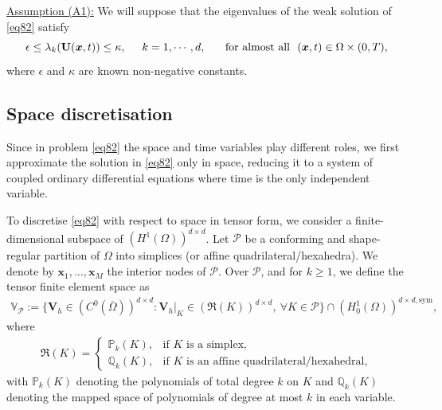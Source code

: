 \documentclass[final,12pt]{amsart}
\theoremstyle{plain}
\theoremstyle{definition}
\newcommand\bx{\boldsymbol{x}}
\newcommand\calP{{\mathcal{P}}}
\newcommand\bU{\mathbf{U}}
\begin{document}
\noindent\underline{Assumption (A1):} We will suppose that the eigenvalues of the weak solution of \eqref{eq82} satisfy 
\begin{equation}
	\epsilon\leq \lambda_{k}(\bU(\bx,t))\leq \kappa, \hspace{0.5cm}k=1,\cdots,d,\hspace{0.5cm}\text{ for almost all}\ \  (\bx,t)\in \Omega\times(0,T),\label{eq14}
\end{equation}
where $\epsilon$ and $\kappa$ are known non-negative constants.


\subsection{Space discretisation}
Since in problem \eqref{eq82} the space and time variables play different roles, we first approximate the solution in \eqref{eq82} only in space, reducing it to a system of coupled ordinary differential equations where time is the only independent variable.

To discretise \eqref{eq82} with respect to space in tensor form, we consider a finite-dimensional subspace of \((H^{1}(\Omega))^{d\times d}\). Let \(\calP\) be a conforming and shape-regular partition of \(\Omega\) into simplices (or affine quadrilateral/hexahedra).  We denote by $\boldsymbol{x}_1^{},\ldots,\boldsymbol{x}_M^{}$ the interior nodes
of  \(\calP\).
Over \(\calP\), and for \(k \geq 1\), we define the tensor finite element space as
\begin{align}
	\mathbb{V}_\calP := \{\mathbf{V}_h \in (C^{0}(\overline{\Omega}))^{d\times d} : \mathbf{V}_h|_{K} \in (\mathfrak{R}(K))^{d\times d}, \ \forall K \in \calP \} \cap (H_{0}^{1}(\Omega))^{d\times d, \textrm{sym}}, \label{eq1_tensor}
\end{align}
where
\begin{align}
	\mathfrak{R}(K) = 
	\begin{cases} 
		\mathbb{P}_{k}(K), & \text{if } K \text{ is a simplex}, \\
		\mathbb{Q}_{k}(K), & \text{if } K \text{ is an affine quadrilateral/hexahedral},\label{simplexquadri}
	\end{cases}
\end{align}
with \(\mathbb{P}_{k}(K)\) denoting the polynomials of total degree \(k\) on \(K\) and \(\mathbb{Q}_{k}(K)\) denoting the mapped space of polynomials of degree at most \(k\) in each variable.
\end{document}
